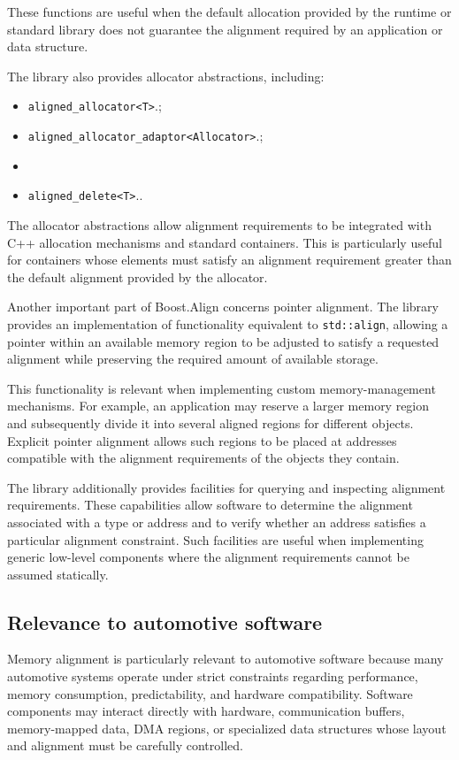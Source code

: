 These functions are useful when the default allocation provided by the runtime or standard library does not guarantee 
the alignment required by an application or data structure.

The library also provides allocator abstractions, including:

\begin{itemize}
\item \verb|aligned_allocator<T>|.;
\item \verb|aligned_allocator_adaptor<Allocator>|.;
\item \item \verb|aligned_delete<T>|..
\end{itemize}

The allocator abstractions allow alignment requirements to be integrated with C++ allocation mechanisms and standard containers.
This is particularly useful for containers whose elements must satisfy an alignment requirement greater than 
the default alignment provided by the allocator.

Another important part of Boost.Align concerns pointer alignment.
The library provides an implementation of functionality equivalent to \texttt{std::align}, 
allowing a pointer within an available memory region to be adjusted to satisfy a requested alignment 
while preserving the required amount of available storage.

This functionality is relevant when implementing custom memory-management mechanisms.
For example, an application may reserve a larger memory region and subsequently divide it into several aligned regions for different objects.
Explicit pointer alignment allows such regions to be placed at addresses compatible with the alignment requirements of the objects they contain.

The library additionally provides facilities for querying and inspecting alignment requirements.
These capabilities allow software to determine the alignment associated with a type or address and 
to verify whether an address satisfies a particular alignment constraint. 
Such facilities are useful when implementing generic low-level components where the alignment requirements cannot be assumed statically.

\subsection{Relevance to automotive software}

Memory alignment is particularly relevant to automotive software because many automotive systems operate under strict constraints 
regarding performance, memory consumption, predictability, and hardware compatibility. Software components may interact directly with hardware, 
communication buffers, memory-mapped data, DMA regions, or specialized data structures whose layout and alignment must be carefully controlled.

